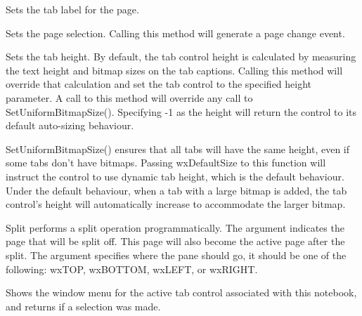 Sets the tab label for the page.

\label{wxauinotebooksetselection}


Sets the page selection.  Calling this method will generate a page change event.

\label{wxauinotebooksettabctrlheight}


Sets the tab height.  By default, the tab control height is calculated
by measuring the text height and bitmap sizes on the tab captions.  Calling this
method will override that calculation and set the tab control to the specified
height parameter.  A call to this method will override any call to SetUniformBitmapSize().
Specifying -1 as the height will return the control to its default auto-sizing behaviour.

\label{wxauinotebooksetuniformbitmapsize}


SetUniformBitmapSize() ensures that all tabs will have the same height, even
if some tabs don't have bitmaps.  Passing wxDefaultSize to this function will
instruct the control to use dynamic tab height, which is the default behaviour.
Under the default behaviour, when a tab with a large bitmap is added, the tab control's
height will automatically increase to accommodate the larger bitmap.


Split performs a split operation programmatically. The argument  indicates
the page that will be split off.  This page will also become the active page after the
split.  The  argument specifies where the pane should go, it should be one
of the following: wxTOP, wxBOTTOM, wxLEFT, or wxRIGHT.

\label{wxauinotebookshowwindowmenu}


Shows the window menu for the active tab control associated with this notebook,
and returns \true if a selection was made.

